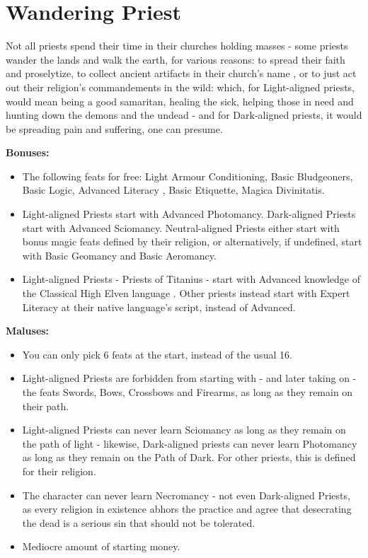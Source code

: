 \section{Wandering Priest}
Not all priests spend their time in their churches holding masses - some priests wander the lands and walk the earth, for various reasons: to spread their faith and proselytize, to collect ancient artifacts in their church's name , or to just act out their religion's commandements in the wild: which, for Light-aligned priests, would mean being a good samaritan, healing the sick, helping those in need and hunting down the demons and the undead - and for Dark-aligned priests, it would be spreading pain and suffering, one can presume. 


\textbf{Bonuses:}
\begin{itemize}
	\item The following feats for free: Light Armour Conditioning, Basic Bludgeoners, Basic Logic, Advanced Literacy , Basic Etiquette, Magica Divinitatis.
	\item Light-aligned Priests start with Advanced Photomancy. Dark-aligned Priests start with Advanced Sciomancy. Neutral-aligned Priests either start with bonus magic feats defined by their religion, or alternatively, if undefined, start with Basic Geomancy and Basic Aeromancy.
	\item Light-aligned Priests - Priests of Titanius - start with Advanced knowledge of the Classical High Elven language . Other priests instead start with Expert Literacy at their native language's script, instead of Advanced.
\end{itemize}
\textbf{Maluses:}
\begin{itemize}
	\item You can only pick 6 feats at the start, instead of the usual 16.
	\item Light-aligned Priests are forbidden from starting with - and later taking on - the feats Swords, Bows, Crossbows and Firearms, as long as they remain on their path.
	\item Light-aligned Priests can never learn Sciomancy as long as they remain on the path of light - likewise, Dark-aligned priests can never learn Photomancy as long as they remain on the Path of Dark. For other priests, this is defined for their religion.
	\item The character can never learn Necromancy - not even Dark-aligned Priests, as every religion in existence  abhors the practice and agree that desecrating the dead is a serious sin that should not be tolerated.
	\item Mediocre amount of starting money.
\end{itemize}

